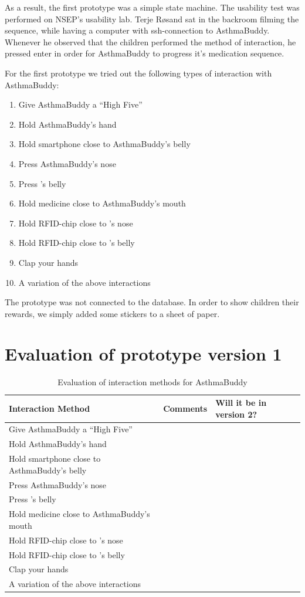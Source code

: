 As a result, the first prototype was a simple state machine. The usability test was performed on NSEP's usability lab. Terje R\o sand sat in the backroom filming the sequence, while having a computer with ssh-connection to AsthmaBuddy. Whenever he observed that the children performed the method of interaction, he pressed enter in order for AsthmaBuddy to progress it's medication sequence. 
 
For the first prototype we tried out the following types of interaction with AsthmaBuddy:
\begin{enumerate}
	\item{Give AsthmaBuddy a ``High Five''}
	\item{Hold AsthmaBuddy's hand}
	\item{Hold smartphone close to AsthmaBuddy's belly}
	\item{Press AsthmaBuddy's nose}
	\item{Press \buddy{}'s belly}
	\item{Hold medicine close to AsthmaBuddy's mouth}
	\item{Hold RFID-chip close to \buddy{}'s nose}
	\item{Hold RFID-chip close to \buddy{}'s belly}
	\item{Clap your hands}
	\item{A variation of the above interactions}
\end{enumerate}

The prototype was not connected to the database. In order to show children their rewards, we simply added some stickers to a sheet of paper. 


\section{Evaluation of prototype version 1}

\begin{table}[H]
\begin{tabular}{|p{5.0cm} | p{6.0cm} | p{3.0cm} |}
\hline 
\textbf{Interaction Method} & \textbf{Comments} & \textbf{Will it be in version 2?}\\
\hline
	Give AsthmaBuddy a ``High Five'' & & \\
\hline
	Hold AsthmaBuddy's hand & & \\
\hline
	Hold smartphone close to AsthmaBuddy's belly & & \\
\hline
	Press AsthmaBuddy's nose & & \\
\hline
	Press \buddy{}'s belly & & \\
\hline
	Hold medicine close to AsthmaBuddy's mouth & & \\
\hline
	Hold RFID-chip close to \buddy{}'s nose & & \\
\hline
	Hold RFID-chip close to \buddy{}'s belly & & \\
\hline
	Clap your hands & & \\
\hline
	A variation of the above interactions & & \\
\hline
\end{tabular}
\caption{Evaluation of interaction methods for AsthmaBuddy}
\label{tab:interactioneval}
\end{table}


